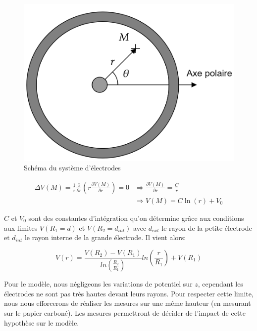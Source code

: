 \documentclass[12pt]{article}
\begin{document}
	\begin{figure}[!h]
		\begin{center}
			\includegraphics[scale=0.2]{img/schema.png}
			\caption{Schéma du système d'électrodes}
		\end{center}
	\end{figure}

	\begin{align*}
		\Delta V(M) = \frac{1}{r} \frac{\partial}{\partial r} \left( r \frac{\partial V(M)}{\partial r} \right) = 0 & \Rightarrow \frac{\partial V(M)}{\partial r} = \frac{C}{r} \\
		& \Rightarrow V(M) = C \ln(r) + V_0
	\end{align*}	
		
	$C$ et $V_0$ sont des constantes d'intégration qu'on détermine grâce aux conditions aux limites $V(R_1 = d)$ et $V(R_2 = d_{int})$ avec $d_{ext}$ le rayon de la petite électrode et $d_{int}$ le rayon interne de la grande électrode. Il vient alors:
	
	\begin{equation}
		V(r) = \frac{V(R_2) - V(R_1)}{ln(\frac{R_2}{R_1})} ln(\frac{r}{R_1}) + V(R_1)
	\end{equation}

	Pour le modèle, nous négligeons les variations de potentiel sur $z$, cependant les électrodes ne sont pas très hautes devant leurs rayons. Pour respecter cette limite, nous nous efforcerons de réaliser
	les mesures sur une même hauteur (en mesurant sur le papier carboné). Les mesures permettront de décider de l'impact de cette hypothèse sur le modèle.
	
\end{document}

